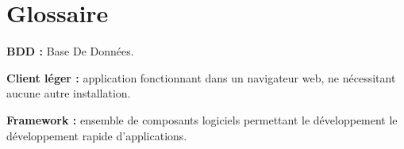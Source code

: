 \cleardoublepage

\chapter*{Glossaire}

\thispagestyle{empty}



\textbf{BDD :} Base De Données.


\textbf{Client léger :} application fonctionnant dans un navigateur web, ne nécessitant aucune autre installation.


\textbf{Framework :} ensemble de composants logiciels permettant le développement le développement rapide d'applications.